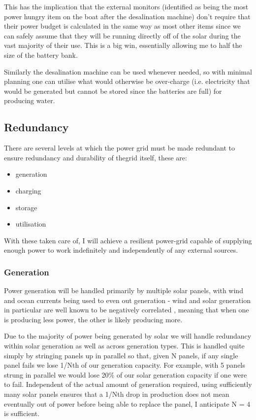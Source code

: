 This has the implication that the external monitors (identified as being the most power hungry item on the boat after the desalination machine) don't require that their power budget is calculated in the same way as most other items since we can safely assume that they will be running directly off of the solar during the vast majority of their use. This is a big win, essentially allowing me to half the size of the battery bank.

Similarly the desalination machine can be used whenever needed, so with minimal planning one can utilise what would otherwise be over-charge (i.e. electricity that would be generated but cannot be stored since the batteries are full) for producing water.

\subsection{Redundancy}
There are several levels at which the power grid must be made redundant to ensure redundancy and durability of thegrid itself, these are:
\begin{itemize}
    \item generation
    \item charging
    \item storage
    \item utilisation
\end{itemize}

With these taken care of, I will achieve a resilient power-grid capable of supplying enough power to work indefinitely and independently of any external sources.

\subsubsection{Generation}
Power generation will be handled primarily by multiple solar panels, with wind and ocean currents being used to even out generation - wind and solar generation in particular are well known to be negatively correlated \cite{wind-solar-correlation}, meaning that when one is producing less power, the other is likely producing more.

Due to the majority of power being generated by solar we will handle redundancy within solar generation as well as across generation types. This is handled quite simply by stringing panels up in parallel so that, given N panels, if any single panel fails we lose 1/Nth of our generation capacity. For example, with 5 panels strung in parallel we would lose 20\% of our solar generation capacity if one were to fail. Independent of the actual amount of generation required, using sufficiently many solar panels ensures that a 1/Nth drop in production does not mean eventually out of power before being able to replace the panel, I anticipate N = 4 is sufficient.


